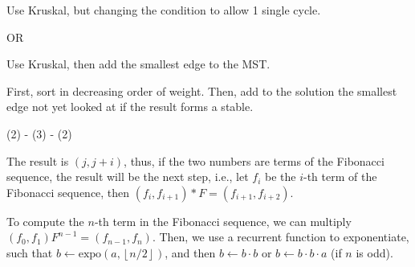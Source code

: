 Use Kruskal, but changing the condition to allow 1 single cycle.

OR

Use Kruskal, then add the smallest edge to the MST.



First, sort in decreasing order of weight.
Then, add to the solution the smallest edge not yet looked at if the result forms a stable.


(2) - (3) - (2)



The result is $\left( j, j+i \right) $, thus, if the two numbers are terms of the Fibonacci sequence, the result will be the next step, i.e., let $f_i$ be the $i$-th term of the Fibonacci sequence, then $\left( f_i, f_{i+1} \right) * F = \left( f_{i+1}, f_{i+2} \right)$.

To compute the $n $-th term in the Fibonacci sequence, we can multiply $\left( f_0, f_1 \right) F^{n-1} = \left( f_{n-1}, f_n \right)$.
Then, we use a recurrent function to exponentiate, such that $b \gets \text{expo}(a, \left\lfloor n / 2 \right\rfloor)$, and then $b \gets b\cdot b$ or $b \gets b\cdot b\cdot a$ (if $n$ is odd).

